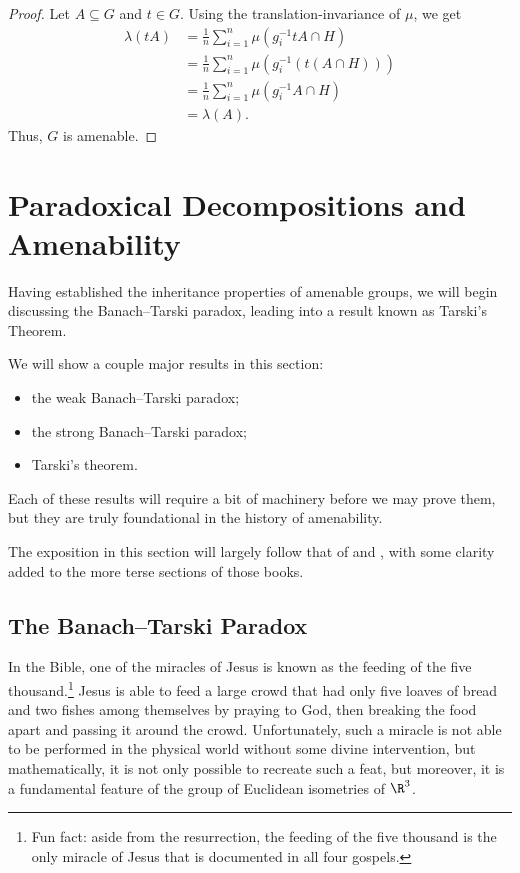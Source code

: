 \documentclass[10pt]{mypackage2}
\begin{document}
\begin{proof}
  Let $A\subseteq G$ and $t\in G$. Using the translation-invariance of $\mu$, we get
  \begin{align*}
    \lambda\left(tA\right) &= \frac{1}{n}\sum_{i=1}^{n}\mu\left(g_i^{-1}tA\cap H\right)\\
                           &= \frac{1}{n}\sum_{i=1}^{n}\mu\left(g_i^{-1}\left(t\left(A\cap H\right)\right)\right)\\
                           &= \frac{1}{n}\sum_{i=1}^{n}\mu\left(g_i^{-1}A\cap H\right)\\
                           &= \lambda\left(A\right).
  \end{align*}
  Thus, $G$ is amenable.
\end{proof}
\section{Paradoxical Decompositions and Amenability}\label{sec:banach_tarski_tarskis_theorem}%
Having established the inheritance properties of amenable groups, we will begin discussing the Banach--Tarski paradox, leading into a result known as Tarski's Theorem.\newline

We will show a couple major results in this section:
\begin{itemize}
  \item the weak Banach--Tarski paradox;
  \item the strong Banach--Tarski paradox;
  \item Tarski's theorem.
\end{itemize}
Each of these results will require a bit of machinery before we may prove them, but they are truly foundational in the history of amenability.\newline

The exposition in this section will largely follow that of \cite{amenable_banach_algebras} and \cite{lectures_on_amenability}, with some clarity added to the more terse sections of those books.
\subsection{The Banach--Tarski Paradox}%
In the Bible, one of the miracles of Jesus is known as the feeding of the five thousand.\footnote{Fun fact: aside from the resurrection, the feeding of the five thousand is the only miracle of Jesus that is documented in all four gospels.} Jesus is able to feed a large crowd that had only five loaves of bread and two fishes among themselves by praying to God, then breaking the food apart and passing it around the crowd. Unfortunately, such a miracle is not able to be performed in the physical world without some divine intervention, but mathematically, it is not only possible to recreate such a feat, but moreover, it is a fundamental feature of the group of Euclidean isometries of $\R^3$.\newline
\end{document}
